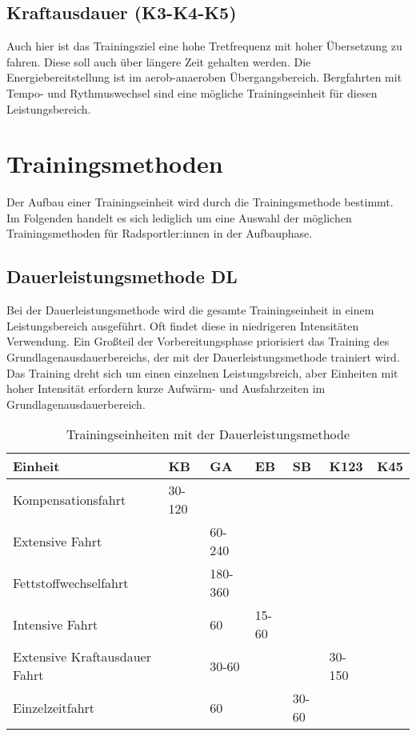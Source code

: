 \subsection{Kraftausdauer (K3-K4-K5)}
Auch hier ist das Trainingsziel eine hohe Tretfrequenz mit hoher Übersetzung zu fahren. Diese soll auch über längere Zeit gehalten werden. Die Energiebereitstellung ist im aerob-anaeroben Übergangsbereich. Bergfahrten mit Tempo- und Rythmuswechsel sind eine mögliche Trainingseinheit für diesen Leistungsbereich.

\section{Trainingsmethoden}
\label{grundlagen:methoden}

Der Aufbau einer Trainingseinheit wird durch die Trainingsmethode bestimmt. Im Folgenden handelt es sich lediglich um eine Auswahl der möglichen Trainingsmethoden für Radsportler:innen in der Aufbauphase.  \cite[40-43]{Radsporttraining} 
\subsection{Dauerleistungsmethode DL}
Bei der Dauerleistungsmethode wird die gesamte Trainingseinheit in einem Leistungsbereich ausgeführt. Oft findet diese in niedrigeren Intensitäten Verwendung. Ein Großteil der Vorbereitungsphase priorisiert das Training des Grundlagenausdauerbereichs, der mit der Dauerleistungsmethode trainiert wird.
Das Training dreht sich um einen einzelnen Leistungsbreich, aber Einheiten mit hoher Intensität erfordern kurze Aufwärm- und Ausfahrzeiten im Grundlagenausdauerbereich.
\begin{table}[h]
\centering  
    \begin{tabularx}{\textwidth}{|b|ssssss|}
    \hline
    \textbf{Einheit} & \textbf{KB} & \textbf{GA}& \textbf{EB}& \textbf{SB}& \textbf{K123}   &\textbf{K45} \\  \hline
    Kompensationsfahrt                  & 30-120 &         &             &        &        &           \\ \hline
    Extensive Fahrt                     &        & 60-240  &             &        &        &           \\ \hline
    Fettstoffwechselfahrt               &        & 180-360 &             &        &        &           \\ \hline
    Intensive Fahrt                     &        & 60      & 15-60       &        &        &           \\ \hline
    Extensive Kraftausdauer Fahrt       &        & 30-60   &             &        & 30-150 &           \\ \hline
    Einzelzeitfahrt                     &        & 60      &             & 30-60  &        &           \\ \hline
    \end{tabularx}
    \caption{Trainingseinheiten mit der Dauerleistungsmethode}
    \label{table:fahrtspiel}
\end{table}
